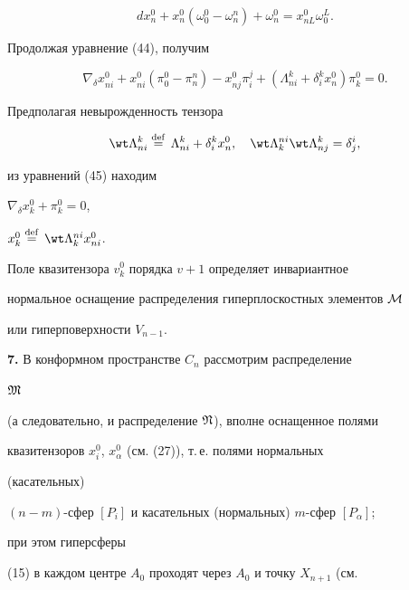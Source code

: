 \begin{pf}
\begin{equation}
d x^0_n+x^0_n(\omega^0_0-\omega^n_n)+\omega^0_n= 


x^0_{n L}\omega^L_0. 


\end{equation} 


Продолжая уравнение (44), получим 


\begin{equation} 


\nabla_\delta x^0_{n i}+x^0_{n i}(\pi^0_0-\pi^n_n)- 


x^0_{n j}\pi^j_i+(\Lambda^k_{n i}+\delta^k_i x^0_n)\pi^0_k=0. 


\end{equation} 


 


Предполагая невырожденность тензора 


$$ 


\wt\Lambda^k_{n i}\eqdef\Lambda^k_{n i}+\delta^k_i 


x^0_n,\quad \wt\Lambda^{n i}_k\wt\Lambda^k_{n j}=\delta^i_j, 


$$ 


из уравнений (45) находим 


$\nabla_\delta x^0_k+\pi^0_k=0$, 


$x^0_k\eqdef\wt\Lambda^{n i}_k x^0_{n i}$. 


Поле квазитензора $v^0_k$ порядка $v+1$ определяет инвариантное 


нормальное оснащение распределения гиперплоскостных элементов $\cal M$ 


или гиперповерхности $V_{n-1}$. 


\end{pf} 


 


{\bf 7.} В конформном пространстве $C_n$ рассмотрим распределение 


$\frak M$ 


(а следовательно, и распределение $\frak N$), вполне оснащенное полями 


квазитензоров $x^0_i$, $x^0_\alpha$ (см. (27)), т.\,е. полями нормальных 


(касательных) 


$(n-m)$-сфер $[P_i]$ и касательных (нормальных) $m$-сфер $[P_\alpha]$; 


при этом гиперсферы 


(15) в каждом центре $A_0$ проходят через $A_0$ и точку $X_{n+1}$ (см. 


